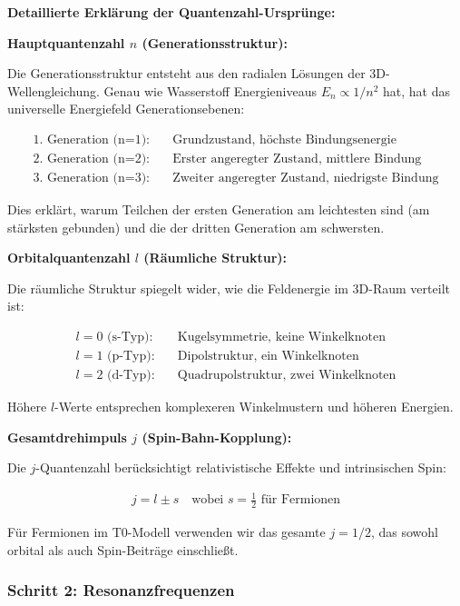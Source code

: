\documentclass[12pt,a4paper]{article}
\begin{document}
	\textbf{Detaillierte Erklärung der Quantenzahl-Ursprünge:}
	
	\textbf{Hauptquantenzahl $n$ (Generationsstruktur):}
	
	Die Generationsstruktur entsteht aus den radialen Lösungen der 3D-Wellengleichung. Genau wie Wasserstoff Energieniveaus $E_n \propto 1/n^2$ hat, hat das universelle Energiefeld Generationsebenen:
	
	\begin{align}
		\text{1. Generation (n=1):} \quad &\text{Grundzustand, höchste Bindungsenergie} \\
		\text{2. Generation (n=2):} \quad &\text{Erster angeregter Zustand, mittlere Bindung} \\
		\text{3. Generation (n=3):} \quad &\text{Zweiter angeregter Zustand, niedrigste Bindung}
	\end{align}
	
	Dies erklärt, warum Teilchen der ersten Generation am leichtesten sind (am stärksten gebunden) und die der dritten Generation am schwersten.
	
	\textbf{Orbitalquantenzahl $l$ (Räumliche Struktur):}
	
	Die räumliche Struktur spiegelt wider, wie die Feldenergie im 3D-Raum verteilt ist:
	
	\begin{align}
		l=0 \text{ (s-Typ):} \quad &\text{Kugelsymmetrie, keine Winkelknoten} \\
		l=1 \text{ (p-Typ):} \quad &\text{Dipolstruktur, ein Winkelknoten} \\
		l=2 \text{ (d-Typ):} \quad &\text{Quadrupolstruktur, zwei Winkelknoten}
	\end{align}
	
	Höhere $l$-Werte entsprechen komplexeren Winkelmustern und höheren Energien.
	
	\textbf{Gesamtdrehimpuls $j$ (Spin-Bahn-Kopplung):}
	
	Die $j$-Quantenzahl berücksichtigt relativistische Effekte und intrinsischen Spin:
	
	\begin{align}
		j = l \pm s \quad \text{wobei } s = \frac{1}{2} \text{ für Fermionen}
	\end{align}
	
	Für Fermionen im T0-Modell verwenden wir das gesamte $j = 1/2$, das sowohl orbital als auch Spin-Beiträge einschließt.
	
	\subsubsection{Schritt 2: Resonanzfrequenzen}
	\label{subsubsec:step2}
	
\end{document}

